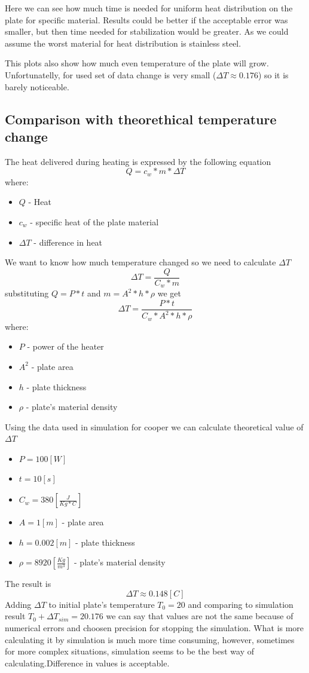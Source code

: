 \documentclass[a4paper,12pt]{article}
\begin{document}
Here we can see how much time is needed for uniform heat distribution on the plate for specific material. Results could be better if the acceptable error was smaller, but then time needed for stabilization would be greater. As we could assume the worst material for heat distribution is stainless steel. 

This plots also show how much even temperature of the plate will grow. Unfortunatelly, for used set of data change is very small ($\Delta T \approx 0.176$) so it is barely noticeable.
\subsection{Comparison with theorethical temperature change}
The heat delivered during heating is expressed by the following equation
\begin{equation*}
Q = c_w*m*\Delta T
\end{equation*}
where:
\begin{itemize}
\item $Q$ - Heat
\item $c_w$ - specific heat of the plate material
\item $\Delta T$ - difference in heat
\end{itemize}
We want to know how much temperature changed so we need to calculate $\Delta T$
\begin{equation*}
\Delta T = \frac{Q}{C_w*m} 
\end{equation*}
substituting $Q = P*t$ and $m = A^2*h*\rho$ we get 
\begin{equation*}
\Delta T = \frac{P*t}{C_w*A^2*h*\rho}
\end{equation*}
where:
\begin{itemize}
\item $P$ - power of the heater
\item $A^2$ - plate area
\item $h$ - plate thickness
\item $\rho$ - plate's material density
\end{itemize}
Using the data used in simulation for cooper we can calculate theoretical value of $\Delta T$
\begin{itemize}
\item $P = 100[W]$
\item $t = 10[s]$
\item $C_w = 380[\frac{J}{Kg*C}]$
\item $A = 1[m]$ - plate area
\item $h = 0.002[m]$ - plate thickness
\item $\rho = 8920[\frac{Kg}{m^3}]$ - plate's material density
\end{itemize}
The result is
\begin{equation*}
\Delta T \approx 0.148[C]
\end{equation*}
Adding $\Delta T$ to initial plate's temperature $T_0=20$ and comparing to simulation result $T_0 + \Delta T_{sim}=20.176$ we can say that values are not the same because of numerical errors and choosen precision for stopping the simulation. What is more calculating it by simulation is much more time consuming, however, sometimes for more complex situations, simulation seems to be the best way of calculating.Difference in values is acceptable.
\end{document}

